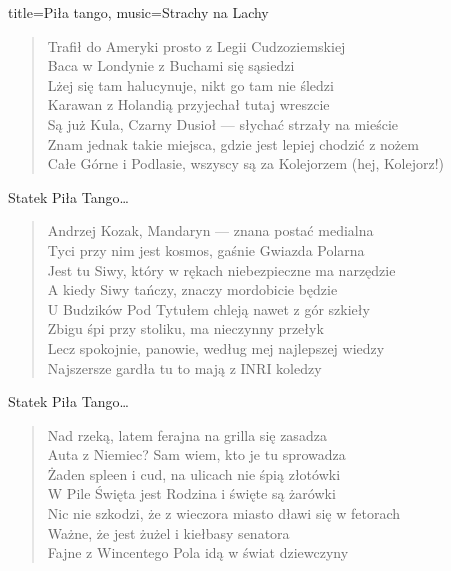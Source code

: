 \begin{song}{title={Piła tango}, music={Strachy na Lachy}}
\begin{verse}
        Trafił do Ameryki prosto z Legii Cudzoziemskiej \\
        Baca w Londynie z Buchami się sąsiedzi \\
        Lżej się tam halucynuje, nikt go tam nie śledzi \\
        Karawan z Holandią przyjechał tutaj wreszcie \\
        Są już Kula, Czarny Dusioł --- słychać strzały na mieście \\
        Znam jednak takie miejsca, gdzie jest lepiej chodzić z nożem \\
        Całe Górne i Podlasie, wszyscy są za Kolejorzem (hej, Kolejorz!)
    \end{verse}
    \begin{chorus}
        Statek Piła Tango\ldots
    \end{chorus}
    \begin{verse}
        Andrzej Kozak, Mandaryn --- znana postać medialna \\
        Tyci przy nim jest kosmos, gaśnie Gwiazda Polarna \\
        Jest tu Siwy, który w rękach niebezpieczne ma narzędzie \\
        A kiedy Siwy tańczy, znaczy mordobicie będzie \\
        U Budzików Pod Tytułem chleją nawet z gór szkieły \\
        Zbigu śpi przy stoliku, ma nieczynny przełyk \\
        Lecz spokojnie, panowie, według mej najlepszej wiedzy \\
        Najszersze gardła tu to mają z INRI koledzy
    \end{verse}
    \begin{chorus}
        Statek Piła Tango\ldots
    \end{chorus}
    \begin{verse}
        Nad rzeką, latem ferajna na grilla się zasadza \\
        Auta z Niemiec? Sam wiem, kto je tu sprowadza \\
        Żaden spleen i cud, na ulicach nie śpią złotówki \\
        W Pile Święta jest Rodzina\footnotemark{} i święte są żarówki \\
        Nic nie szkodzi, że z wieczora miasto dławi się w fetorach \\
        Ważne, że jest żużel i kiełbasy senatora \\
        Fajne z Wincentego Pola idą w świat dziewczyny \\

\end{verse}
\end{song}
